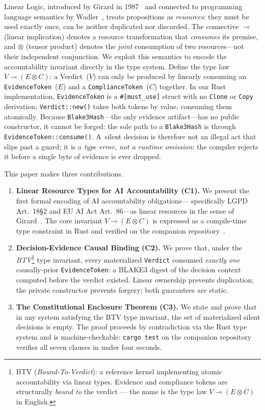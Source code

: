 Linear Logic, introduced by Girard in 1987~\cite{girard1987linear} and
connected to programming language semantics by Wadler~\cite{wadler1991linear},
treats propositions as \emph{resources}: they must be used exactly once,
can be neither duplicated nor discarded.
The connective $\multimap$ (linear implication) denotes a resource transformation
that \emph{consumes} its premise, and $\otimes$ (tensor product) denotes the
\emph{joint} consumption of two resources---not their independent conjunction.
We exploit this semantics to encode the accountability invariant directly
in the type system.
Define the type law $V \multimap (E \otimes C)$:
a Verdict~($V$) can only be produced by linearly consuming an
\texttt{EvidenceToken}~($E$) and a \texttt{ComplianceToken}~($C$) together.
In our Rust implementation, \texttt{EvidenceToken} is a \texttt{\#[must\_use]}
struct with no \texttt{Clone} or \texttt{Copy} derivation;
\texttt{Verdict::new()} takes both tokens by value, consuming them atomically.
Because \texttt{Blake3Hash}---the only evidence artifact---has no public
constructor, it cannot be forged: the sole path to a \texttt{Blake3Hash}
is through \texttt{EvidenceToken::consume()}.
A~silent decision is therefore not an illegal act that slips past a guard;
it is a \emph{type error, not a runtime omission}:
the compiler rejects it before a single byte of evidence is ever dropped.

This paper makes three contributions.
\begin{enumerate}
  \item \textbf{Linear Resource Types for AI Accountability (C1).}
    We present the first formal encoding of AI accountability obligations---
    specifically LGPD Art.~18\S2 and EU AI Act Art.~86---as linear resources
    in the sense of Girard~\cite{girard1987linear}.
    The core invariant $V \multimap (E \otimes C)$ is expressed as a
    compile-time type constraint in Rust and verified on the companion
    repository~\cite{soares2026a, soares2026b}.

  \item \textbf{Decision-Evidence Causal Binding (C2).}
    We prove that, under the \emph{BTV}\footnote{BTV (\textit{Bound-To-Verdict}):
    a reference kernel implementing atomic accountability via linear types.
    Evidence and compliance tokens are structurally \emph{bound to} the
    verdict --- the name is the type law $V \multimap (E \otimes C)$ in English.}
    type invariant, every materialized
    \texttt{Verdict} consumed \emph{exactly one} causally-prior
    \texttt{EvidenceToken}: a BLAKE3 digest of the decision context
    computed before the verdict existed.
    Linear ownership prevents duplication; the private constructor
    prevents forgery; both guarantees are static.

  \item \textbf{The Constitutional Enclosure Theorem (C3).}
    We state and prove that in any system satisfying the BTV type invariant,
    the set of materialized silent decisions is empty.
    The proof proceeds by contradiction via the Rust type system and is
    machine-checkable: \texttt{cargo test} on the companion repository
    verifies all seven clauses in under four seconds.\
\end{enumerate}

